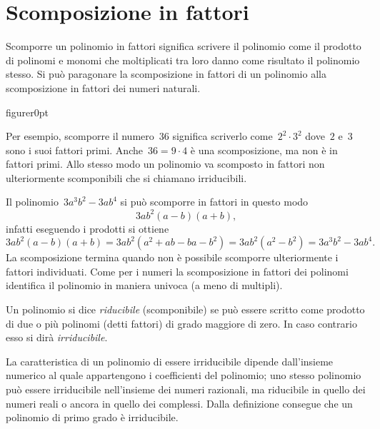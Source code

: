 
\chapter{Scomposizione in fattori}

Scomporre un polinomio in fattori significa scrivere il polinomio come il prodotto di polinomi e monomi che
moltiplicati tra loro danno come risultato il polinomio stesso. Si può paragonare la scomposizione in fattori
di un polinomio alla scomposizione in fattori dei numeri naturali.

\begin{wrapfloat}{figure}{r}{0pt}
 
\end{wrapfloat}

Per esempio, scomporre il numero~$36$ significa scriverlo come~$2^{2}\cdot 3^{2}$ dove~$2$ e~$3$ sono i suoi fattori primi.
Anche~$36 = 9 \cdot 4$ è una scomposizione, ma non è in fattori primi. Allo stesso modo un polinomio va scomposto in fattori non ulteriormente
scomponibili che si chiamano irriducibili. %

Il polinomio~$3a^{3}b^{2}-3ab^{4}$ si può scomporre in fattori in questo modo \[3ab^{2}(a-b)(a+b)\text{,}\] infatti eseguendo i prodotti si
ottiene \[3ab^{2}(a-b)(a+b)=3ab^{2}(a^{2}+ab-ba-b^{2})=3ab^{2}\left(a^{2}-b^{2}\right)=3a^{3}b^{2}-3ab^{4}.\]
La scomposizione termina quando non è possibile scomporre ulteriormente i fattori individuati.
Come per i numeri la scomposizione in fattori dei polinomi identifica il polinomio in maniera univoca (a meno di multipli).

\begin{definizione}
Un polinomio si dice \emph{riducibile} (scomponibile) se può essere scritto come prodotto di due o più polinomi (detti fattori) di grado maggiore di zero.
In caso contrario esso si dirà \emph{irriducibile}.
\end{definizione}

La caratteristica di un polinomio di essere irriducibile dipende dall'insieme numerico al quale appartengono i coefficienti del polinomio;
uno stesso polinomio può essere irriducibile nell'insieme dei numeri razionali, ma riducibile in quello dei numeri reali o
ancora in quello dei complessi.
Dalla definizione consegue che un polinomio di primo grado è irriducibile.

